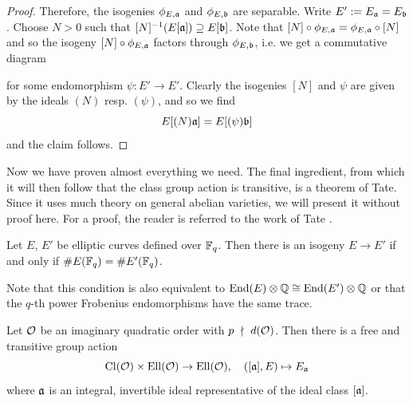 \begin{proof}
    Therefore, the isogenies $\phi_{E, \mathfrak{a}}$ and $\phi_{E, \mathfrak{b}}$ are separable.
    Write $E' := E_{\mathfrak{a}} = E_{\mathfrak{b}}$.
    Choose $N > 0$ such that $[N]^{-1}(E[\mathfrak{a}]) \supseteq E[\mathfrak{b}]$.
    Note that $[N] \circ \phi_{E, \mathfrak{a}} = \phi_{E, \mathfrak{a}} \circ [N]$ and so the isogeny $[N] \circ \phi_{E, \mathfrak{a}}$ factors through $\phi_{E, \mathfrak{b}}$, i.e. we get a commutative diagram
    \begin{center}
    \end{center}
    for some endomorphism $\psi: E' \to E'$.
    Clearly the isogenies $[N]$ and $\psi$ are given by the ideals $(N)$ resp. $(\psi)$, and so we find
    \begin{equation*}
        E[(N)\mathfrak{a}] = E[(\psi)\mathfrak{b}]
    \end{equation*}
    and the claim follows.
\end{proof}
Now we have proven almost everything we need.
The final ingredient, from which it will then follow that the class group action is transitive, is a theorem of Tate.
Since it uses much theory on general abelian varieties, we will present it without proof here.
For a proof, the reader is referred to the work of Tate \cite{tate}.
\begin{theorem}
    \label{prop:isogeny_theorem}
    Let $E$, $E'$ be elliptic curves defined over $\mathbb{F}_q$.
    Then there is an isogeny $E \to E'$ if and only if $\#E(\mathbb{F}_q) = \#E'(\mathbb{F}_q)$.
\end{theorem}
Note that this condition is also equivalent to $\mathrm{End}(E) \otimes \mathbb{Q} \cong \mathrm{End}(E') \otimes \mathbb{Q}$ or that the $q$-th power Frobenius endomorphisms have the same trace. 
\begin{theorem}
    \label{prop:class_group_action}
    Let $\mathcal{O}$ be an imaginary quadratic order with $p \ \nmid \  d(\mathcal{O})$.
    Then there is a free and transitive group action
    \begin{equation*}
        \mathrm{Cl}(\mathcal{O}) \times \mathrm{Ell}(\mathcal{O}) \to \mathrm{Ell}(\mathcal{O}), \quad ([\mathfrak{a}], E) \mapsto E_{\mathfrak{a}}
    \end{equation*}
    where $\mathfrak{a}$ is an integral, invertible ideal representative of the ideal class $[\mathfrak{a}]$.
\end{theorem}
